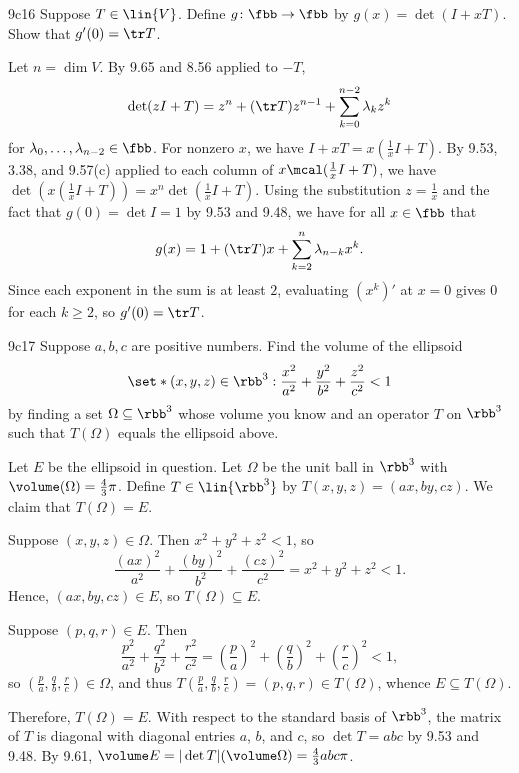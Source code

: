 \begin{exercise}{9c16}
    Suppose $T \in \lin{V}$.
    Define $g \colon \fbb \to \fbb$ by $g(x) = \det(I + xT)$.
    Show that $g'(0) = \tr T$.

\end{exercise}

\begin{sol}
    Let $n = \dim V$.
    By 9.65 and 8.56 applied to $-T$,
    \[
        \det(zI + T) = z^n + (\tr T) z^{n-1} + \sum_{k=0}^{n-2} \lambda_k z^k
    \]
    for $\lambda_0, \ldots, \lambda_{n-2} \in \fbb$.
    For nonzero $x$, we have $I + xT = x(\frac{1}{x}I + T)$.
    By 9.53, 3.38, and 9.57(c) applied to each column of $x \mcal(\frac{1}{x}I + T)$, we have $\det(x(\frac{1}{x}I + T)) = x^n \det(\frac{1}{x}I + T)$.
    Using the substitution $z = \frac{1}{x}$ and the fact that $g(0) = \det I = 1$ by 9.53 and 9.48, we have for all $x \in \fbb$ that
    \[
        g(x) = 1 + (\tr T) x + \sum_{k=2}^{n} \lambda_{n-k} x^k.
    \]
    Since each exponent in the sum is at least $2$, evaluating $(x^k)'$ at $x = 0$ gives $0$ for each $k \geq 2$, so $g'(0) = \tr T$.
\end{sol}

\begin{exercise}{9c17}
    Suppose $a, b, c$ are positive numbers.
    Find the volume of the ellipsoid
    \[
        \set*{(x, y, z) \in \rbb^3 : \frac{x^2}{a^2} + \frac{y^2}{b^2} + \frac{z^2}{c^2} < 1}
    \]
    by finding a set $\Omega \subseteq \rbb^3$ whose volume you know and an operator $T$ on $\rbb^3$ such that $T(\Omega)$ equals the ellipsoid above.
\end{exercise}

\begin{sol}
    Let $E$ be the ellipsoid in question.
    Let $\Omega$ be the unit ball in $\rbb^3$ with $\volume(\Omega) = \frac{4}{3} \pi$.
    Define $T \in \lin{\rbb^3}$ by $T(x, y, z) = (ax, by, cz)$.
    We claim that $T(\Omega) = E$.

    \rightset Suppose $(x, y, z) \in \Omega$.
    Then $x^2 + y^2 + z^2 < 1$, so
    \[
        \frac{(ax)^2}{a^2} + \frac{(by)^2}{b^2} + \frac{(cz)^2}{c^2} = x^2 + y^2 + z^2 < 1.
    \]
    Hence, $(ax, by, cz) \in E$, so $T(\Omega) \subseteq E$.

    \leftset Suppose $(p, q, r) \in E$.
    Then
    \[
        \frac{p^2}{a^2} + \frac{q^2}{b^2} + \frac{r^2}{c^2} = \left(\frac{p}{a}\right)^2 + \left(\frac{q}{b}\right)^2 + \left(\frac{r}{c}\right)^2 < 1,
    \]
    so $(\frac{p}{a}, \frac{q}{b}, \frac{r}{c}) \in \Omega$, and thus $T(\frac{p}{a}, \frac{q}{b}, \frac{r}{c}) = (p, q, r) \in T(\Omega)$, whence $E \subseteq T(\Omega)$.

    Therefore, $T(\Omega) = E$.
    With respect to the standard basis of $\rbb^3$, the matrix of $T$ is diagonal with diagonal entries $a$, $b$, and $c$, so $\det T = abc$ by 9.53 and 9.48.
    By 9.61, $\volume E = |\det T|(\volume \Omega) = \frac{4}{3} abc \pi$.
\end{sol}

